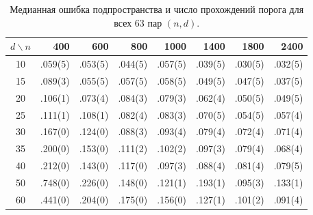 \documentclass[11pt,a4paper]{article}
\begin{document}
\begin{table}[ht]
\centering
\small
\begin{tabular}{c|rrrrrrr}
\hline
$d\backslash n$ & 400 & 600 & 800 & 1000 & 1400 & 1800 & 2400 \\
\hline
10 & .059(5) & .053(5) & .044(5) & .057(5) & .039(5) & .030(5) & .032(5) \\
15 & .089(3) & .055(5) & .057(5) & .058(5) & .049(5) & .047(5) & .037(5) \\
20 & .106(1) & .073(4) & .084(3) & .079(3) & .062(4) & .050(5) & .049(5) \\
25 & .111(1) & .108(1) & .082(4) & .083(3) & .070(5) & .054(5) & .057(4) \\
30 & .167(0) & .124(0) & .088(3) & .093(4) & .079(4) & .072(4) & .071(4) \\
35 & .200(0) & .153(0) & .111(2) & .102(2) & .097(3) & .079(4) & .068(4) \\
40 & .212(0) & .143(0) & .117(0) & .097(3) & .088(4) & .081(4) & .079(5) \\
50 & .748(0) & .226(0) & .148(0) & .121(1) & .193(1) & .095(3) & .133(1) \\
60 & .441(0) & .204(0) & .175(0) & .156(0) & .127(1) & .101(2) & .091(4) \\
\hline
\end{tabular}
\caption{Медианная ошибка подпространства и число прохождений порога для
всех 63 пар $(n,d)$.}
\label{tab:mi-nd-matrix}
\end{table}
\end{document}
